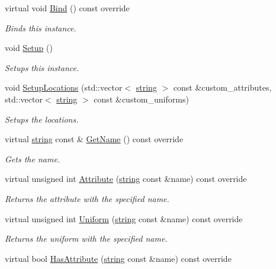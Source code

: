 \begin{DoxyCompactItemize}
virtual void \hyperlink{class_shader_af87442fe762f97d68c68d04b36c97529}{Bind} () const  override
\begin{DoxyCompactList}\small\item\em Binds this instance. \end{DoxyCompactList}\item 
void \hyperlink{class_shader_af26efeb2a7c052dfda56a01769e96a2d}{Setup} ()
\begin{DoxyCompactList}\small\item\em Setups this instance. \end{DoxyCompactList}\item 
void \hyperlink{class_shader_ab9928802c38f22e42aa13fc9e6362832}{Setup\+Locations} (std\+::vector$<$ \hyperlink{_types_8h_ad453f9f71ce1f9153fb748d6bb25e454}{string} $>$ const \&custom\+\_\+attributes, std\+::vector$<$ \hyperlink{_types_8h_ad453f9f71ce1f9153fb748d6bb25e454}{string} $>$ const \&custom\+\_\+uniforms)
\begin{DoxyCompactList}\small\item\em Setups the locations. \end{DoxyCompactList}\item 
virtual \hyperlink{_types_8h_ad453f9f71ce1f9153fb748d6bb25e454}{string} const \& \hyperlink{class_shader_a932251e18a2f24b3a8736c168f868765}{Get\+Name} () const  override
\begin{DoxyCompactList}\small\item\em Gets the name. \end{DoxyCompactList}\item 
virtual unsigned int \hyperlink{class_shader_a71e7ee4ac77b41d8f7139e087eeb6bc1}{Attribute} (\hyperlink{_types_8h_ad453f9f71ce1f9153fb748d6bb25e454}{string} const \&name) const  override
\begin{DoxyCompactList}\small\item\em Returns the attribute with the specified name. \end{DoxyCompactList}\item 
virtual unsigned int \hyperlink{class_shader_a37f108fd8b105ebadad3a14ac1ff517f}{Uniform} (\hyperlink{_types_8h_ad453f9f71ce1f9153fb748d6bb25e454}{string} const \&name) const  override
\begin{DoxyCompactList}\small\item\em Returns the uniform with the specified name. \end{DoxyCompactList}\item 
virtual bool \hyperlink{class_shader_a2ce7eb5ef13cf6950c872f790a2605c2}{Has\+Attribute} (\hyperlink{_types_8h_ad453f9f71ce1f9153fb748d6bb25e454}{string} const \&name) const  override

\end{DoxyCompactItemize}
